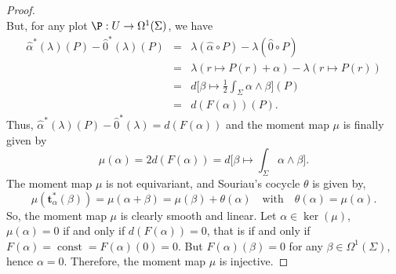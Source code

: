 \documentclass[10pt,reqno,twoside]{amsart}
\newcommand{\qmbox}[1]{\quad\mbox{#1}\quad}
\DeclareMathOperator{\const}{const}
\newcommand{\undemi}{\frac{1}{2}}
\newcommand{\et}{\mathbf{t}}
\theoremstyle{plain}
\theoremstyle{definition}
\begin{document}
\begin{proof}
$$      $$
    But,
    for any plot $\P: U \to \Omega^1(\Sigma)$,
    we have
    \begin{eqnarray*}
      \hat\alpha^*(\lambda) (P) - \hat 0^*(\lambda) (P) & = & \lambda(\hat \alpha \circ P) - \lambda(\hat 0 \circ P) \\
      & = & \lambda (r \mapsto P (r) +\alpha) - \lambda (r \mapsto P (r)) \\
      & = & d\bigg[\beta \mapsto \undemi \int_\Sigma \alpha \wedge \beta \bigg](P) \\
      & = & d(F(\alpha))(P).
    \end{eqnarray*}
    Thus,
    $\hat \alpha^*(\lambda) (P) - \hat 0^*(\lambda) = d(F(\alpha))$ and the moment map $\mu$ is finally given by
    $$
      \mu(\alpha) = 2 d(F(\alpha)) = d \bigg[\beta \mapsto \int_\Sigma \alpha \wedge \beta \bigg].
      $$
    The moment map $\mu$ is not equivariant,
    and Souriau's cocycle $\theta$ is given by,
    $$
      \mu(\et_\alpha^*(\beta)) = \mu(\alpha + \beta) = \mu(\beta) + \theta(\alpha) \qmbox{with} \theta(\alpha) = \mu(\alpha).
      $$
    So,
    the moment map $\mu$ is clearly smooth and linear.
    Let $\alpha \in \ker(\mu)$,
    $\mu(\alpha) = 0$ if and only if $d(F(\alpha)) = 0$,
    that is if and only if $F(\alpha) = \const = F(\alpha)(0) = 0$.
    But $F(\alpha)(\beta) = 0$ for any $\beta \in \Omega^1(\Sigma)$,
    hence $\alpha = 0$.
    Therefore,
    the moment map $\mu$ is injective.
  \end{proof}
  
\end{document}
